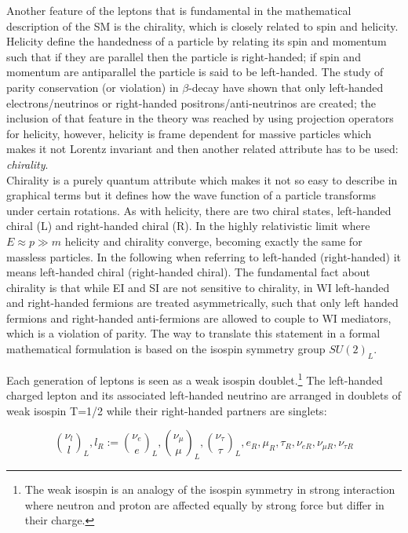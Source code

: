 \noindent Another feature of the leptons that is fundamental in the mathematical description of the SM is the chirality, which is closely related to spin and helicity. Helicity define the handedness of a particle by relating its spin and momentum such that if they are parallel then the particle is right-handed; if spin and momentum are antiparallel the particle is said to be left-handed. The study of parity conservation (or violation) in $\beta$-decay have shown that only left-handed electrons/neutrinos or right-handed positrons/anti-neutrinos are created\cite{goldhaber}; the inclusion of that feature in the theory was reached by using projection operators for helicity, however, helicity is frame dependent for massive particles which makes it not Lorentz invariant and then another related attribute has to be used: \textit{chirality}.\\

\noindent Chirality is a purely quantum attribute which makes it not so easy to describe in graphical terms but it defines how the wave function of a particle transforms under certain rotations. As with helicity, there are two chiral states, left-handed chiral (L) and right-handed chiral (R). In the highly relativistic limit where $E\approx p \gg m$ helicity and chirality converge, becoming exactly the same for massless particles.
\noindent In the following when referring to left-handed (right-handed) it means left-handed chiral (right-handed chiral). The fundamental fact about chirality is that while EI and SI are not sensitive to chirality, in WI left-handed and right-handed fermions are treated asymmetrically, such that only left handed fermions and right-handed anti-fermions are allowed to couple to WI mediators, which is a violation of parity. The way to translate this statement in a formal mathematical formulation is based on the isospin symmetry group $SU(2)_L$.   

\noindent Each generation of leptons is seen as a weak isospin doublet.\footnote{The weak isospin is an analogy of the isospin symmetry in strong interaction where neutron and proton are affected equally by strong force but differ in their charge.} The left-handed charged lepton and its associated left-handed neutrino are arranged in doublets of weak isospin T=1/2 while their right-handed partners are singlets:

\begin{equation}
\binom{\nu_l}{l}_L , l_R := \binom{\nu_e}{e}_L , \binom{\nu_\mu}{\mu}_L, \binom{\nu_\tau}{\tau}_L, e_R, \mu_R, \tau_R, \nu_{eR}, \nu_{\mu R}, \nu_{\tau R}
\label{lepton_multiplets}
\end{equation}

